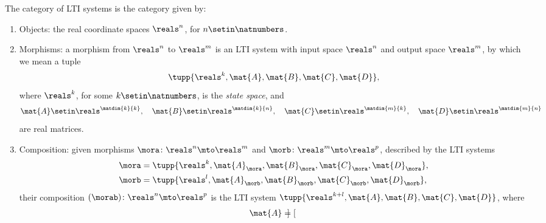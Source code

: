 \begin{ctdefinition}
    \label{def:LTICat}
    The category \LTI of LTI systems is the category given by:

    \constit

    \begin{enumerate}
        \item Objects: the real coordinate spaces $\reals^n$, for $n \setin \natnumbers$.
        \item Morphisms: a morphism from $\reals^n$ to $\reals^m$ is an LTI system with input space $\reals^n$ and output space $\reals^m$, by which we mean a tuple
              \begin{equation}
                  \tupp{\reals^k, \mat{A}, \mat{B}, \mat{C}, \mat{D}},
              \end{equation}
              where $\reals^k$, for some $k \setin \natnumbers$, is the \emph{state space}, and
              \begin{equation}
                  \mat{A} \setin \reals^{\matdim{k}{k}}, \quad
                  \mat{B} \setin \reals^{\matdim{k}{n}}, \quad
                  \mat{C} \setin \reals^{\matdim{m}{k}}, \quad
                  \mat{D} \setin \reals^{\matdim{m}{n}}
              \end{equation}
              are real matrices.
        \item Composition: given morphisms $\mora \colon \reals^n \mto \reals^m$ and $\morb \colon \reals^m \mto \reals^p$, described by the LTI systems
              \begin{equation}
                  \begin{aligned}
                      \mora & = \tupp{\reals^k, \mat{A}_\mora, \mat{B}_\mora, \mat{C}_\mora, \mat{D}_\mora}, \\
                      \morb & = \tupp{\reals^l, \mat{A}_\morb, \mat{B}_\morb, \mat{C}_\morb, \mat{D}_\morb},
                  \end{aligned}
              \end{equation}
              their composition $(\morab) \colon \reals^n \mto \reals^p$ is the LTI system $\tupp{\reals^{k+l}, \mat{A}, \mat{B}, \mat{C}, \mat{D}}$, where
              \begin{equation}
                  \label{eq:LTI-composition}
                  \begin{aligned}
                      \mat{A} & =\begin{bmatrix}

\end{bmatrix}
\end{aligned}
\end{equation}
\end{enumerate}
\end{ctdefinition}
